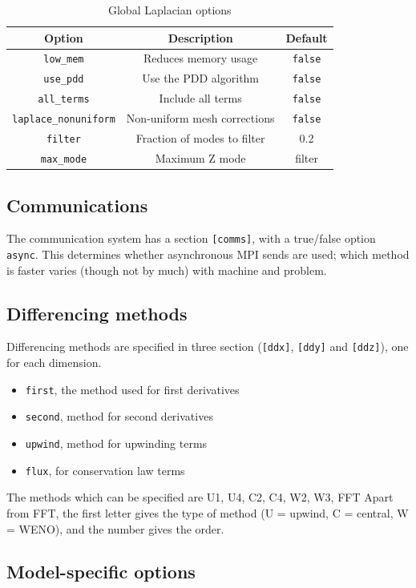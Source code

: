 \documentclass[12pt]{article}
\newcommand{\code}[1]{\texttt{#1}}
\begin{document}
\begin{table}[htbp!]
\caption{Global Laplacian options}
\label{tab:lapopts}
\centering
\begin{tabular}[c]{c c c}
\hline
Option & Description & Default \\
\hline
\texttt{low\_mem} & Reduces memory usage & \texttt{false} \\
\texttt{use\_pdd} & Use the PDD algorithm & \texttt{false} \\
\texttt{all\_terms} & Include all terms & \texttt{false} \\
\texttt{laplace\_nonuniform} & Non-uniform mesh corrections & \texttt{false} \\
\texttt{filter} & Fraction of modes to filter & 0.2 \\
\texttt{max\_mode} & Maximum Z mode & filter \\
\hline
\end{tabular}
\end{table}

\subsection{Communications}
The communication system has a section \code{[comms]}, with a true/false option \code{async}. This
determines whether asynchronous MPI sends are used; which method is faster
varies (though not by much)
with machine and problem.

\subsection{Differencing methods}
\label{sec:diffmethodoptions}
Differencing methods are specified in three section (\code{[ddx]}, \code{[ddy]} and \code{[ddz]}), one
for each dimension.
\begin{itemize}
\item \code{first}, the method used for first derivatives
\item \code{second}, method for second derivatives
\item \code{upwind}, method for upwinding terms
\item \code{flux}, for conservation law terms
\end{itemize}
The methods which can be specified are U1, U4, C2, C4, W2, W3, FFT
Apart from FFT, the first letter gives the type of method (U = upwind, C = central, W = WENO), and
the number gives the order.

\subsection{Model-specific options}
\end{document}
